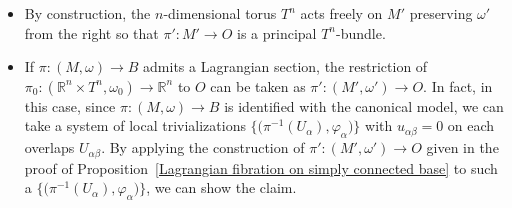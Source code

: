 \documentclass[10pt,a4paper]{amsart}
\numberwithin{equation}{section}
\newcommand{\R}{\mathbb{R}}
\begin{document}
\begin{Remark}\label{remarks on M'}\quad
\begin{itemize}\itemsep=0pt
\item[(1)] By construction, the $n$-dimensional torus $T^n$ acts freely on $M'$ preserving $\omega'$ from the right so that $\pi'\colon M'\to O$ is a principal $T^n$-bundle.
\item[(2)] If $\pi\colon (M,\omega)\to B$ admits a Lagrangian section, the restriction of $\pi_0\colon {(\R^n\times T^n,\omega_0)\to \R^n}$ to $O$ can be taken as $\pi'\colon (M',\omega')\to O$. In fact, in this case, since $\pi\colon (M,\omega)\to B$ is identified with the canonical model, we can take a system of local trivializations $\big\{\bigl(\pi^{-1}(U_\alpha),\varphi_\alpha\bigr)\big\}$ with $u_{\alpha\beta}=0$ on each overlaps $U_{\alpha\beta}$. By applying the construction of $\pi'\colon (M',\omega')\to O$ given in the proof of Proposition~\ref{Lagrangian fibration on simply connected base} to such a $\big\{\bigl(\pi^{-1}(U_\alpha),\varphi_\alpha\bigr)\big\}$, we can show the claim.
\end{itemize}
\end{Remark}
\end{document}
